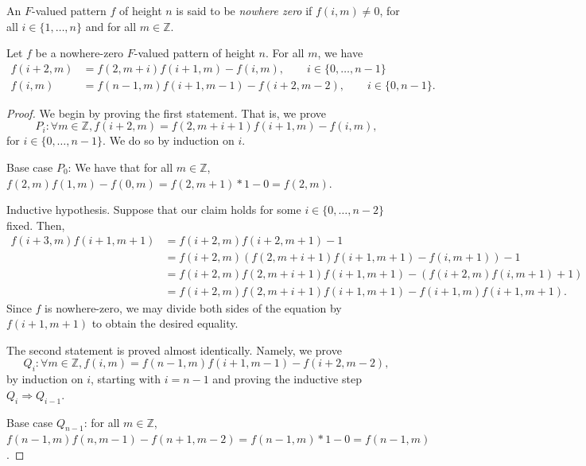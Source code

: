 An $F$-valued pattern $f$ of height $n$ is said to be {\it nowhere zero} if $f(i,m) \neq 0$, for all $i \in \{1,\ldots , n\}$ and for all $m \in \mathbb{Z}$.
\begin{lemma}
    \label{l:pattern_nContinuant}
    \leanok
    Let $f$ be a nowhere-zero $F$-valued pattern of height $n$. For all $m$, we have 
    \begin{align*}
        f(i+2,m) &= f(2,m+i) f(i+1,m) - f(i,m), \qquad i \in \{0, \ldots, n-1\} \\
        f (i,m) &= f (n-1,m) f (i+1,m-1) - f(i+2,m-2), \qquad i \in \{0,n-1\}. 
    \end{align*}
\end{lemma}
\begin{proof} \leanok
    We begin by proving the first statement. That is, we prove
    \[
        P_i : \forall m \in \mathbb{Z},  f(i+2,m) = f(2,m+i+1) f(i+1,m) - f(i,m),
    \] 
    for $ i \in \{0, \ldots, n-1\}$. We do so by induction on $i$. 

    Base case $P_0$: We have that for all $m \in \mathbb{Z}$, $f(2,m) f(1,m) - f(0,m) = f (2,m+1)*1 - 0 = f (2,m)$. 

    Inductive hypothesis. Suppose that our claim holds for some  $i \in \{0,\ldots, n-2\}$ fixed. Then, 
    \begin{align*}
        f (i+3,m) f (i+1,m+1) & = f (i+2,m) f (i+2,m+1)-1 \\
                            &= f (i+2,m) (f(2,m+i+1) f(i+1,m+1) - f(i,m+1)) -1 \\
                            &= f (i+2,m) f (2,m+i+1) f (i+1,m+1) - (f (i+2,m)f (i,m+1) + 1) \\
                            &= f (i+2,m) f (2,m+i+1) f (i+1,m+1) - f(i+1,m) f (i+1,m+1).
    \end{align*}
    Since $f$ is nowhere-zero, we may divide both sides of the equation by $f (i+1,m+1)$ to obtain the desired equality.

    The second statement is proved almost identically. Namely, we prove
    \[
        Q_i: \forall m \in \mathbb{Z}, f (i,m) = f (n-1,m) f (i+1,m-1) - f(i+2,m-2),
    \]
    by induction on $i$, starting with $i = n-1$ and proving the inductive step $Q_i \Rightarrow Q_{i-1}$. 

    Base case $Q_{n-1}$: for all $m \in \mathbb{Z}$, $ f (n-1,m) f (n,m-1) - f(n+1,m-2) = f (n-1,m)*1 - 0 = f (n-1,m)$. 


\end{proof}
